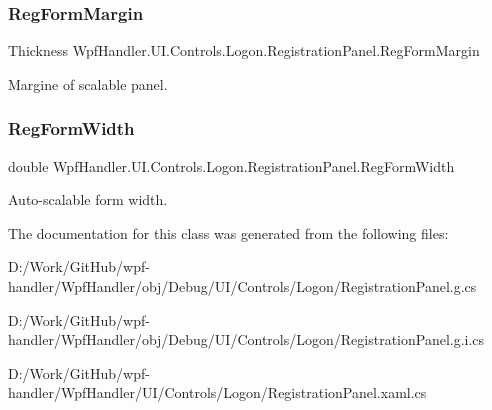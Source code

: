 \subsubsection{\texorpdfstring{Reg\+Form\+Margin}{RegFormMargin}}
{\footnotesize\ttfamily Thickness Wpf\+Handler.\+U\+I.\+Controls.\+Logon.\+Registration\+Panel.\+Reg\+Form\+Margin\hspace{0.3cm}{\ttfamily [get]}}



Margine of scalable panel. 

\mbox{\label{class_wpf_handler_1_1_u_i_1_1_controls_1_1_logon_1_1_registration_panel_a91323c1b7f498e79c891dbb9a968537d}} 
\subsubsection{\texorpdfstring{Reg\+Form\+Width}{RegFormWidth}}
{\footnotesize\ttfamily double Wpf\+Handler.\+U\+I.\+Controls.\+Logon.\+Registration\+Panel.\+Reg\+Form\+Width\hspace{0.3cm}{\ttfamily [get]}}



Auto-\/scalable form width. 



The documentation for this class was generated from the following files\+:\begin{DoxyCompactItemize}
\item 
D\+:/\+Work/\+Git\+Hub/wpf-\/handler/\+Wpf\+Handler/obj/\+Debug/\+U\+I/\+Controls/\+Logon/Registration\+Panel.\+g.\+cs\item 
D\+:/\+Work/\+Git\+Hub/wpf-\/handler/\+Wpf\+Handler/obj/\+Debug/\+U\+I/\+Controls/\+Logon/Registration\+Panel.\+g.\+i.\+cs\item 
D\+:/\+Work/\+Git\+Hub/wpf-\/handler/\+Wpf\+Handler/\+U\+I/\+Controls/\+Logon/Registration\+Panel.\+xaml.\+cs\end{DoxyCompactItemize}

